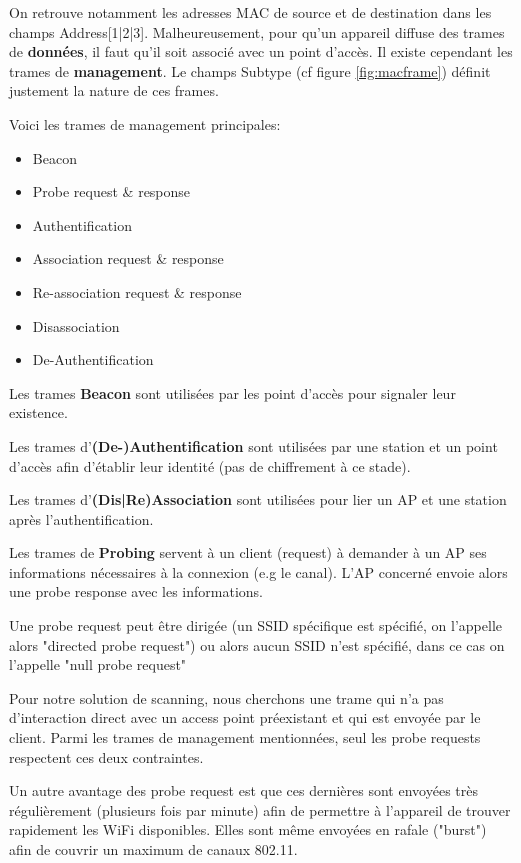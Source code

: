 On retrouve notamment les adresses MAC de source et de destination dans les champs Address[1|2|3].
Malheureusement, pour qu'un appareil diffuse des trames de \textbf{données}, il faut qu'il soit associé avec un point d'accès. 
Il existe cependant les trames de \textbf{management}. Le champs Subtype (cf figure \ref{fig:macframe}) définit justement
la nature de ces frames. 

Voici les trames de management principales:
\begin{itemize}
    \item Beacon
    \item Probe request \& response
    \item Authentification
    \item Association request \& response
    \item Re-association request \& response
    \item Disassociation
    \item De-Authentification
\end{itemize}

Les trames \textbf{Beacon} sont utilisées par les point d'accès pour signaler leur existence. 

Les trames d'\textbf{(De-)Authentification} sont utilisées par une station et un point d'accès afin d'établir leur identité (pas de chiffrement à ce stade).

Les trames d'\textbf{(Dis|Re)Association} sont utilisées pour lier un AP et une station après l'authentification.

Les trames de \textbf{Probing} servent à un client (request) à demander à un AP ses informations nécessaires à la connexion (e.g le canal).
L'AP concerné envoie alors une probe response avec les informations. 

Une probe request peut être dirigée (un SSID spécifique est spécifié, on l'appelle alors "directed probe request") ou alors aucun SSID n'est spécifié, dans ce cas
on l'appelle "null probe request"

Pour notre solution de scanning, nous cherchons une trame qui n'a pas d'interaction direct avec un access point préexistant
et qui est envoyée par le client. Parmi les trames de management mentionnées, seul les probe requests respectent ces deux contraintes.

Un autre avantage des probe request est que ces dernières sont envoyées très régulièrement (plusieurs fois par minute)
afin de permettre à l'appareil de trouver rapidement les WiFi disponibles. Elles sont même envoyées en rafale ("burst") afin de couvrir
un maximum de canaux 802.11.

